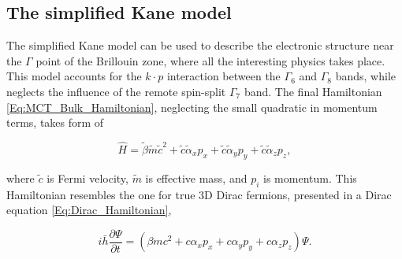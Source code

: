 \documentclass[titlepage,a4paper]{book}
\newcommand{\wciecie}{\quad\phantom{v}}
\begin{document}


\subsection{The simplified Kane model}
\wciecie
The simplified Kane model \cite{Kane_MCT}\cite{Kane_Model} can be used to describe the electronic structure near the $\Gamma$ point of the Brillouin zone, where all the interesting physics takes place. This model accounts for the $k\cdot p$ interaction between the $\Gamma_6$ and $\Gamma_8$ bands, while neglects the influence of the remote spin-split $\Gamma_7$ band. The final Hamiltonian \ref{Eq:MCT_Bulk_Hamiltonian}, neglecting the small quadratic in momentum terms, takes form of

\begin{equation}
\label{Eq:MCT_Bulk_Hamiltonian}
\hat{H} = \tilde{\beta} \tilde{m}\tilde{c}^2 + \tilde{c}\tilde{\alpha}_x p_x + \tilde{c}\tilde{\alpha}_y p_y + \tilde{c}\tilde{\alpha}_z p_z ,
\end{equation}

where $\tilde{c}$ is Fermi velocity, $\tilde{m}$ is effective mass, and $p_i$ is momentum. This Hamiltonian resembles the one for true 3D Dirac fermions, presented in a Dirac equation \ref{Eq:Dirac_Hamiltonian}, 

\begin{equation}
\label{Eq:Dirac_Hamiltonian}
i\bar{h} \frac{\partial \Psi}{\partial t} = \left( \beta mc^2 + c\alpha_x p_x + c\alpha_y p_y + c\alpha_z p_z \right) \Psi.
\end{equation}
\end{document}
